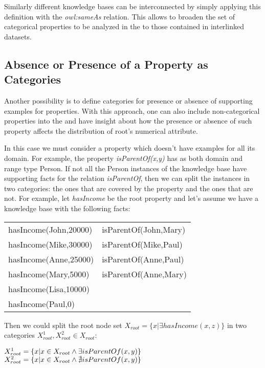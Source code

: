 Similarly different knowledge bases can be interconnected by simply applying this definition with the \emph{owl:sameAs}
relation. This allows to broaden the set of categorical properties to be analyzed in the \graphname to those contained
in interlinked datasets.

\subsection{Absence or Presence of a Property as Categories}

Another possibility is to define categories for presence or absence of supporting examples for properties. With this
approach, one can also
include non-categorical properties into the \graphname and have insight about how the presence or absence of such
property affects the distribution of root's numerical attribute.

In this case we must consider a property which doesn't have examples for all its domain. For example, the property
\emph{isParentOf(x,y)} has as both domain and range type Person. If not all the Person instances of the knowledge base
have supporting facts for the relation \emph{isParentOf}, then we can
split the instances in two categories: the ones that are covered by the property and the ones that are not. For example,
let \emph{hasIncome} be the root property and let's assume we have a knowledge base with the following facts:

\begin{tabular}{*{2}{l}}
  hasIncome(John,20000) & isParentOf(John,Mary) \\
  hasIncome(Mike,30000) & isParentOf(Mike,Paul) \\
  hasIncome(Anne,25000) & isParentOf(Anne,Paul) \\
  hasIncome(Mary,5000) 	& isParentOf(Anne,Mary) \\
  hasIncome(Lisa,10000) & 			\\
  hasIncome(Paul,0)	& 			\\
\end{tabular}

Then we could split the root node set $X_{root}=\{x|\exists hasIncome(x,z)\}$ in two categories $X_{root}^1,X_{root}^2
\in
X_{root}$:

$X_{root}^1=\{x| x \in X_{root} \land \exists isParentOf(x,y)\} \\$
$X_{root}^2=\{x| x \in X_{root} \land \nexists isParentOf(x,y)\} \\$

